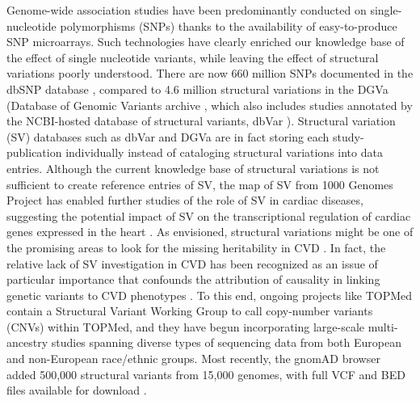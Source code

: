 \documentclass[letter]{bioinfo}
\begin{document}
	
	Genome-wide association studies have been predominantly conducted on single-nucleotide polymorphisms (SNPs) thanks to the availability of easy-to-produce SNP microarrays. Such technologies have clearly enriched our knowledge base of the effect of single nucleotide variants, while leaving the effect of structural variations poorly understood. There are now 660 million SNPs documented in the dbSNP database \citep{NCBI:2018:dbSNP}, compared to 4.6 million structural variations in the DGVa (Database of Genomic Variants archive \citep{EMBL-EBI:2018:Database}, which also includes studies annotated by the NCBI-hosted database of structural variants, dbVar \citep{NCBI:2018:dbVar}).  Structural variation (SV) databases such as dbVar and DGVa are in fact storing each study-publication individually instead of cataloging structural variations into data entries. Although the current knowledge base of structural variations is not sufficient to create reference entries of SV, the map of SV from 1000 Genomes Project \citep{Sudmant:2015:integrated} has enabled further studies of the role of SV in cardiac diseases, suggesting the potential impact of SV on the transcriptional regulation of cardiac genes expressed in the heart \citep{Haas:2018:Genomic}. As envisioned, structural variations might be one of the promising areas to look for the missing heritability in CVD \citep{Eichler:2010:Missing}.  In fact, the relative lack of SV investigation in CVD has been recognized as an issue of particular importance that confounds the attribution of causality in linking genetic variants to CVD phenotypes \cite{Macrae:2017:Closing}.  To this end, ongoing projects like TOPMed contain a Structural Variant Working Group to call copy-number variants (CNVs) within TOPMed, and they have begun incorporating large-scale multi-ancestry studies spanning diverse types of sequencing data from both European and non-European race/ethnic groups.  Most recently, the gnomAD browser added 500,000 structural variants from 15,000 genomes, with full VCF and BED files available for download \citep{Collins:2019:Open}.  
\end{document}
